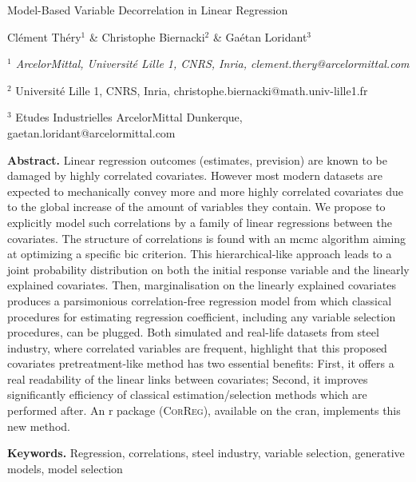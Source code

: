\documentclass[11pt,a4paper]{article}
\begin{document}
\begin{center}
{\Large
	{\sc Model-Based Variable Decorrelation in Linear Regression}
}
\bigskip

  Clément Théry$^{1}$ \& Christophe Biernacki$^{2}$ \& Gaétan Loridant$^{3}$
\bigskip

{\it
$^{1}$ ArcelorMittal, Université Lille 1, CNRS, Inria, clement.thery@arcelormittal.com
 
$^{2}$ Université Lille 1, CNRS, Inria, christophe.biernacki@math.univ-lille1.fr

$^{3}$ Etudes Industrielles ArcelorMittal Dunkerque, gaetan.loridant@arcelormittal.com\textbf{}
}
\end{center}
\bigskip

{\bf Abstract.} Linear regression outcomes (estimates, prevision) are known to be damaged by highly correlated covariates. However most modern datasets are expected to mechanically convey more and more highly correlated covariates due to the global increase of the amount of variables they contain. We propose to explicitly model such correlations by a family of linear regressions between the covariates. The structure of correlations is found with an {\sc mcmc} algorithm aiming at optimizing a specific {\sc bic} criterion. This hierarchical-like approach leads to a joint probability distribution on both the initial response variable and the linearly explained covariates. Then, marginalisation on the linearly explained covariates produces a parsimonious correlation-free regression model from which classical procedures for estimating regression coefficient, including any variable selection procedures, can be plugged.
Both simulated and real-life datasets from steel industry, where correlated variables are frequent, highlight that this proposed covariates pretreatment-like method has two essential benefits: First, it offers a real readability of the linear links between covariates; Second, it improves significantly efficiency of classical estimation/selection methods which are performed after.
An {\sc r} package (\textsc{CorReg}), available on the {\sc cran}, implements this new method.
\smallskip

{\bf Keywords.} Regression, correlations, steel industry, variable selection, generative models, model selection
\end{document}
